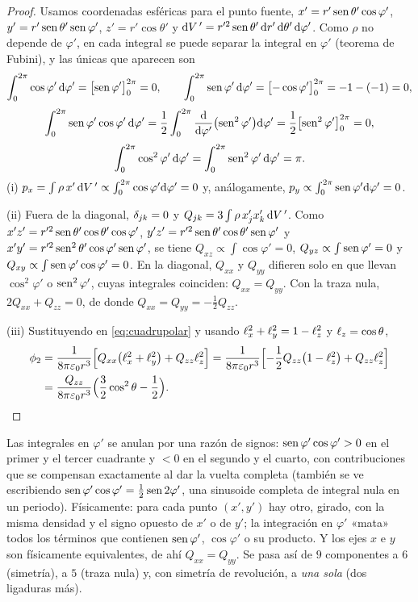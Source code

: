 \begin{proof}
Usamos coordenadas esféricas para el punto fuente, $x'=r'\operatorname{sen}\theta'\cos\varphi'$, $y'=r'\operatorname{sen}\theta'\operatorname{sen}\varphi'$, $z'=r'\cos\theta'$ y
$\mathrm{d} V\,'=r'^{2}\operatorname{sen}\theta'\,\mathrm{d} r'\,\mathrm{d}\theta'\,\mathrm{d}\varphi'$. Como $\rho$ no depende de $\varphi'$, en cada integral se puede separar la integral en $\varphi'$ (teorema de Fubini),
y las únicas que aparecen son
\[
  \int_{0}^{2\pi}\cos\varphi'\,\mathrm{d}\varphi'=\bigl[\operatorname{sen}\varphi'\bigr]_{0}^{2\pi}=0,\qquad
  \int_{0}^{2\pi}\operatorname{sen}\varphi'\,\mathrm{d}\varphi'=\bigl[-\cos\varphi'\bigr]_{0}^{2\pi}=-1-(-1)=0,
\]
\[
  \int_{0}^{2\pi}\operatorname{sen}\varphi'\cos\varphi'\,\mathrm{d}\varphi'=\frac12\int_{0}^{2\pi}\frac{\mathrm{d}}{\mathrm{d}\varphi'}\bigl(\operatorname{sen}^{2}\varphi'\bigr)\mathrm{d}\varphi'=\frac12\bigl[\operatorname{sen}^{2}\varphi'\bigr]_{0}^{2\pi}=0,
\]
\[
  \int_{0}^{2\pi}\cos^{2}\varphi'\,\mathrm{d}\varphi'=\int_{0}^{2\pi}\operatorname{sen}^{2}\varphi'\,\mathrm{d}\varphi'=\pi .
\]
(i) $p_x=\int\rho\,x'\,\mathrm{d} V\,'\propto\int_0^{2\pi}\cos\varphi'\mathrm{d}\varphi'=0$ y, análogamente, $p_y\propto\int_0^{2\pi}\operatorname{sen}\varphi'\mathrm{d}\varphi'=0$.

(ii) Fuera de la diagonal, $\delta_{jk}=0$ y $Q_{jk}=3\int\rho\,x'_jx'_k\,\mathrm{d} V\,'$. Como $x'z'=r'^{2}\operatorname{sen}\theta'\cos\theta'\cos\varphi'$, $y'z'=r'^{2}\operatorname{sen}\theta'\cos\theta'\operatorname{sen}\varphi'$ y
$x'y'=r'^{2}\operatorname{sen}^{2}\theta'\cos\varphi'\operatorname{sen}\varphi'$, se tiene $Q_{xz}\propto\int\cos\varphi'=0$, $Q_{yz}\propto\int\operatorname{sen}\varphi'=0$ y $Q_{xy}\propto\int\operatorname{sen}\varphi'\cos\varphi'=0$. En la
diagonal, $Q_{xx}$ y $Q_{yy}$ difieren solo en que llevan $\cos^{2}\varphi'$ o $\operatorname{sen}^{2}\varphi'$, cuyas integrales coinciden: $Q_{xx}=Q_{yy}$. Con la traza nula,
$2Q_{xx}+Q_{zz}=0$, de donde $Q_{xx}=Q_{yy}=-\frac12Q_{zz}$.

(iii) Sustituyendo en \cref{eq:cuadrupolar} y usando $\ell_{x}^{2}+\ell_{y}^{2}=1-\ell_{z}^{2}$ y $\ell_{z}=\cos\theta$,
\begin{align*}
  \phi_{2}&=\frac{1}{8\pi\varepsilon_{0} r^{3}}\Bigl[Q_{xx}\bigl(\ell_{x}^{2}+\ell_{y}^{2}\bigr)+Q_{zz}\ell_{z}^{2}\Bigr]
  =\frac{1}{8\pi\varepsilon_{0} r^{3}}\Bigl[-\frac12Q_{zz}\bigl(1-\ell_{z}^{2}\bigr)+Q_{zz}\ell_{z}^{2}\Bigr]\\
  &=\frac{Q_{zz}}{8\pi\varepsilon_{0} r^{3}}\Bigl(\frac32\cos^{2}\theta-\frac12\Bigr).\qedhere
\end{align*}
\end{proof}

\begin{observacion}\label{obs:anulacion}
Las integrales en $\varphi'$ se anulan por una razón de signos: $\operatorname{sen}\varphi'\cos\varphi'>0$ en el primer y el tercer cuadrante y $<0$ en el segundo y el cuarto, con
contribuciones que se compensan exactamente al dar la vuelta completa (también se ve escribiendo $\operatorname{sen}\varphi'\cos\varphi'=\frac12\operatorname{sen}2\varphi'$, una sinusoide completa
de integral nula en un periodo). Físicamente: para cada punto $(x',y')$ hay otro, girado, con la misma densidad y el signo opuesto de $x'$ o de $y'$; la integración en
$\varphi'$ «mata» todos los términos que contienen $\operatorname{sen}\varphi'$, $\cos\varphi'$ o su producto. Y los ejes $x$ e $y$ son físicamente equivalentes, de ahí $Q_{xx}=Q_{yy}$. Se
pasa así de $9$ componentes a $6$ (simetría), a $5$ (traza nula) y, con simetría de revolución, a \emph{una sola} (dos ligaduras más).
\end{observacion}

